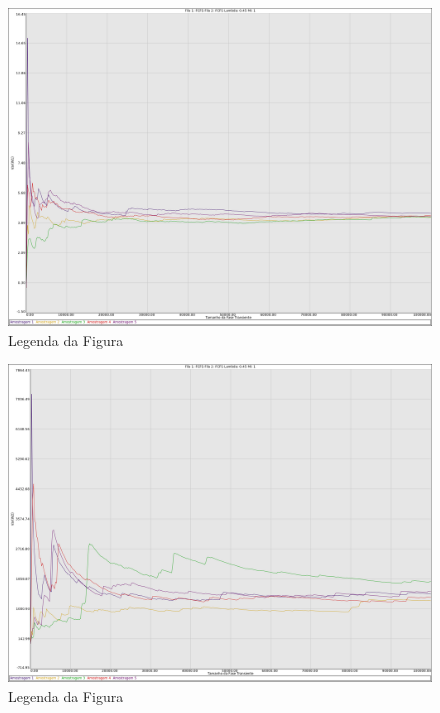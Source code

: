 \documentclass[a4paper,10pt]{article}
\begin{document}
\begin{figure}
	\caption{Legenda da Figura}
	\label{figTransienteFCFSfila1VarW}
	\includegraphics[scale = 0.2]{./graficos_transiente_1/FCFS/09.png}
\end{figure}

\begin{figure}
	\caption{Legenda da Figura}
	\label{figTransienteFCFSfila2VarW}
	\includegraphics[scale = 0.2]{./graficos_transiente_1/FCFS/10.png}
\end{figure}

\clearpage
\end{document}
